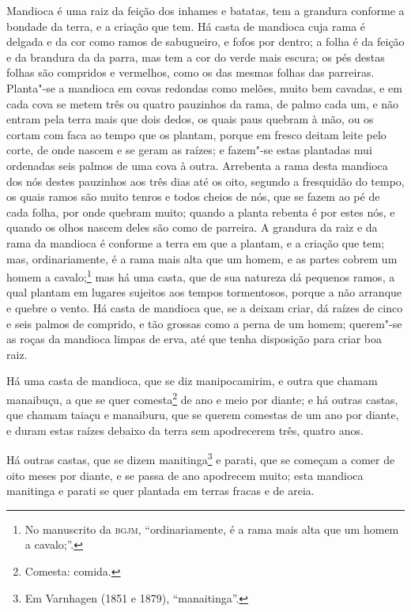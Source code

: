 \begin{linenumbers}
Mandioca é uma raiz da feição dos inhames e batatas, tem a grandura conforme a bondade da
terra, e a criação que tem. Há casta de mandioca cuja rama é delgada e da cor como ramos
de sabugueiro, e fofos por dentro; a folha é da feição e da brandura da da parra, mas tem
a cor do verde mais escura; os pés destas folhas são compridos e vermelhos, como os das
mesmas folhas das parreiras. Planta"-se a mandioca em covas redondas como melões, muito bem
cavadas, e em cada cova se metem três ou quatro pauzinhos da rama, de palmo cada um, e não
entram pela terra mais que dois dedos, os quais paus quebram à mão, ou os cortam com faca
ao tempo que os plantam, porque em fresco deitam leite pelo corte, de onde nascem e se
geram as raízes; e fazem"-se estas plantadas mui ordenadas seis palmos de uma cova à outra.
Arrebenta a rama desta mandioca dos nós destes pauzinhos aos três dias até os oito,
segundo a fresquidão do tempo, os quais ramos são muito tenros e todos cheios de nós, que
se fazem ao pé de cada folha, por onde quebram muito; quando a planta rebenta é por estes
nós, e quando os olhos nascem deles são como de parreira. A grandura da raiz e da rama da
mandioca é conforme a terra em que a plantam, e a criação que tem; mas, ordinariamente, é
a rama mais alta que um homem, e as partes cobrem um homem a cavalo;\footnote{ No
manuscrito da \textsc{bgjm}, ``ordinariamente, é a rama mais alta que um homem a
cavalo;''.} mas há uma casta, que de sua natureza dá pequenos ramos, a qual plantam em
lugares sujeitos aos tempos tormentosos, porque a não arranque e quebre o vento. Há casta
de mandioca que, se a deixam criar, dá raízes de cinco e seis palmos de comprido, e tão
grossas como a perna de um homem; querem"-se as roças da mandioca limpas de erva, até que
tenha disposição para criar boa raiz.

Há uma casta de mandioca, que se diz manipocamirim, e outra que chamam manaibuçu, a que se
quer comesta\footnote{ Comesta: comida.} de ano e meio por diante; e há outras
castas, que chamam taiaçu e manaiburu, que se querem comestas de um ano por diante, e
duram estas raízes debaixo da terra sem apodrecerem três, quatro anos.

Há outras castas, que se dizem manitinga\footnote{ Em Varnhagen (1851 e 1879),
``manaitinga''.} e parati, que se começam a comer de oito meses por diante, e se passa de
ano apodrecem muito; esta mandioca manitinga e parati se quer plantada em terras fracas e
de areia.


\end{linenumbers}
